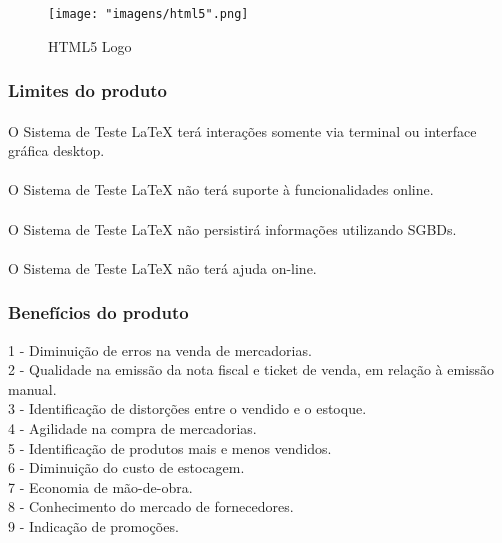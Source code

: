 \documentclass[12pt]{article}
\begin{document}
			\begin{figure}[!h]
				\caption{HTML5 Logo}
				\centering
				\texttt{[image: "imagens/html5".png]}
			\end{figure}
				
		\subsubsection{Limites do produto}
		
			


			\paragraph{} O Sistema de Teste LaTeX terá interações somente via terminal ou interface gráfica desktop.
			\paragraph{} O Sistema de Teste LaTeX não terá suporte à funcionalidades online.
			\paragraph{} O Sistema de Teste LaTeX não persistirá informações utilizando SGBDs.
			\paragraph{} O Sistema de Teste LaTeX não terá ajuda on-line.
						
		\subsubsection{Benefícios do produto}
		
			
			
			1 - Diminuição de erros na  venda de mercadorias.\\
			2 - Qualidade na emissão da nota fiscal e ticket de venda, em relação à emissão manual.\\
			3 - Identificação de distorções entre o vendido e o estoque.\\
			4 - Agilidade na compra de mercadorias.\\
			5 - Identificação de produtos mais e menos vendidos.\\
			6 - Diminuição do custo de estocagem.\\
			7 - Economia de mão-de-obra.\\
			8 - Conhecimento do mercado de fornecedores.\\
			9 - Indicação de promoções.\\
			
			
\end{document}
